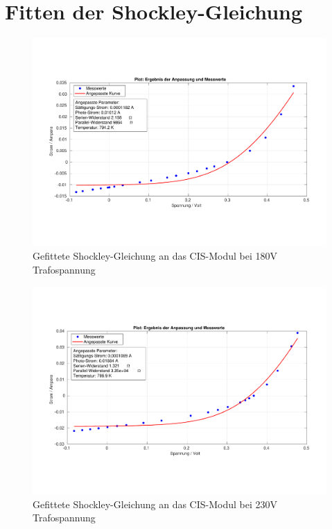 \clearpage

\section{Fitten der Shockley-Gleichung}
\label{section:AnhangShock}

\begin{figure}[ht]
    \centering
    \includegraphics[width = \linewidth]{Bilder/CIS180Plot.pdf}
    \caption{Gefittete Shockley-Gleichung an das CIS-Modul bei 180V Trafospannung}    
\end{figure}

\begin{figure}[ht]
    \centering
    \includegraphics[width = \linewidth]{Bilder/CIS230Plot.pdf}
    \caption{Gefittete Shockley-Gleichung an das CIS-Modul bei 230V Trafospannung}
\end{figure}

